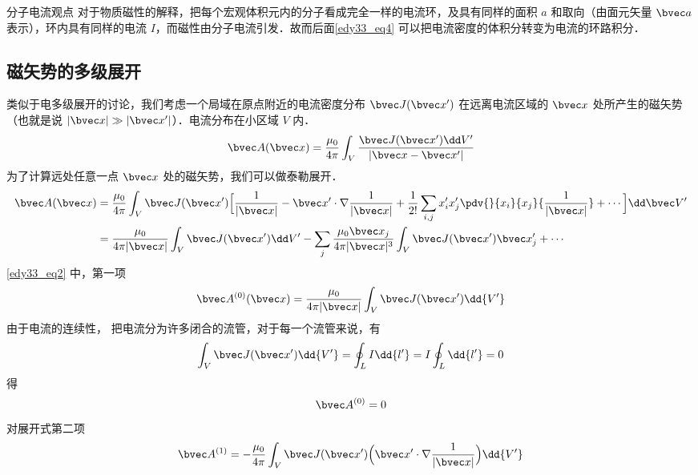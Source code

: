 
\begin{lemma}{分子电流观点}
对于物质磁性的解释，把每个宏观体积元内的分子看成完全一样的电流环，及具有同样的面积 $a$ 和取向（由面元矢量 $\bvec a$ 表示），环内具有同样的电流 $I$，而磁性由分子电流引发．故而后面\autoref{edy33_eq4} 可以把电流密度的体积分转变为电流的环路积分．
\end{lemma}
\subsection{磁矢势的多级展开}
类似于电多级展开的讨论，我们考虑一个局域在原点附近的电流密度分布 $\bvec J(\bvec x')$ 在远离电流区域的 $\bvec x$ 处所产生的磁矢势（也就是说 $|\bvec x|\gg|\bvec x'|$）．电流分布在小区域 $V$ 内．
\begin{equation}
\bvec A(\bvec x)=\dfrac {\mu_0}{4\pi} \int_V \dfrac{ \bvec J(\bvec x^{\prime})\dd V^{\prime}}{|\bvec x - \bvec x'|}\label{edy33_eq1}
\end{equation}
为了计算远处任意一点 $\bvec x$ 处的磁矢势，我们可以做泰勒展开．
\begin{align}
\bvec A(\bvec x)&=\dfrac {\mu_0}{4\pi}\int_V \bvec J(\bvec x')\Big[\dfrac{1}{|\bvec x|}-\bvec x'\cdot\nabla \dfrac{1}{|\bvec x|}+\dfrac{1}{2!}\sum_{i,j}x_i^{\prime}x_j^{\prime}\pdv{}{x_i}{x_j}{\dfrac 1 {|\bvec x|}}+\cdots\Big]\dd \bvec V^{\prime}
\label{edy33_eq2_0}
\\
&=\dfrac{\mu_0}{4\pi|\bvec x|}\int_V \bvec J(\bvec x')\dd V'
-\sum_{j}\dfrac{\mu_0 \bvec x_j}{4\pi |\bvec x|^3}\int_V \bvec J(\bvec x')\bvec x'_j + \cdots
\label{edy33_eq2}
\end{align}
\autoref{edy33_eq2} 中，第一项
\begin{equation}
\bvec A^{(0)}(\bvec x)=\dfrac {\mu_0}{4\pi |\bvec x|}\int_V \bvec J(\bvec x')\dd{ V^{\prime}}\label{edy33_eq3}
\end{equation}
由于电流的连续性，%
把电流分为许多闭合的流管，对于每一个流管来说，有
\begin{equation}
\int_V \bvec J(\bvec x^{\prime}) \dd{V^{\prime}}=\oint_L I\dd{l'}=I\oint_L \dd{l'}=0\label{edy33_eq4}
\end{equation}
得\begin{equation}
\bvec A^{(0)}=0\label{edy33_eq5}
\end{equation}
对展开式第二项
\begin{equation}
\bvec A^{(1)}=-\dfrac{\mu_0 }{4\pi}\int_V \bvec J(\bvec x^{\prime})\Big (\bvec x^{\prime}\cdot\nabla\dfrac{1}{|\bvec x|}\Big)\dd{V^{\prime}}\label{edy33_eq6}
\end{equation}
